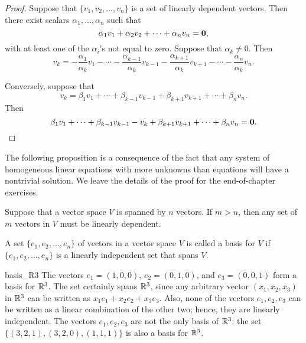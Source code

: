 \begin{proof}
Suppose that $\{ v_1, v_2, \dots, v_n \}$ is a set of linearly dependent
vectors.  Then there exist scalars $\alpha_1, \ldots, \alpha_n$
such that
\[
\alpha_1 v_1 + \alpha_2 v_2 + \cdots + \alpha_n v_n = {\bold 0 },
\]
with at least one of the $\alpha_i$'s not equal to zero.  Suppose that
$\alpha_k \neq 0$. Then 
\[
v_k = - \frac{\alpha_1}{\alpha_k} v_1 
- \cdots 
- \frac{\alpha_{k-1}}{\alpha_k}	v_{k-1}
- \frac{\alpha_{k+1}}{\alpha_k}	v_{k+1}
- \cdots 
- \frac{\alpha_n}{\alpha_k} v_n.
\]


Conversely, suppose that 
\[
v_k = \beta_1 v_1 
+ \cdots 
+ \beta_{k-1} v_{k-1}
+ \beta_{k+1} v_{k+1}
+ \cdots 
+ \beta_n v_n.
\]
Then
\[
\beta_1 v_1 
+ \cdots 
+ \beta_{k-1} v_{k-1}
- v_k
+ \beta_{k+1} v_{k+1}
+ \cdots 
+ \beta_n v_n = {\bold 0}.
\]
\end{proof}

\medskip


The following proposition is a consequence of the fact that any system
of homogeneous linear equations with more unknowns than equations will
have a nontrivial solution.  We leave the details of the proof for the
end-of-chapter exercises. 
 

\begin{proposition}
Suppose that a vector space $V$ is spanned by $n$ vectors. If $m > n$,
then any set of $m$ vectors in $V$ must be linearly dependent. 
\end{proposition}
 
  
A set $\{ e_1, e_2, \ldots, e_n \}$ of vectors in a vector space $V$
is called a {\bfi basis\/} for $V$ if $\{
e_1, e_2, \ldots, e_n \}$ is a linearly independent set that spans
$V$.

 
 
\begin{example}{basis_R3}
The vectors $e_1 = (1, 0, 0)$, $e_2 = (0, 1, 0)$, and $e_3 =(0, 0, 1)$
form a basis for ${\Bbb R}^3$.  The set certainly spans ${\Bbb R}^3$,
since any arbitrary vector $(x_1, x_2, x_3)$ in ${\Bbb R}^3$ can be
written as $x_1 e_1 + x_2 e_2 + x_3 e_3$. Also, none of the vectors
$e_1, e_2, e_3$ can be written as a linear combination of the other
two; hence, they are linearly independent.  The vectors $e_1, e_2,
e_3$ are not the only basis of ${\Bbb R}^3$:  the set $\{ (3, 2, 1),
(3, 2, 0), (1, 1, 1) \}$ is also a basis for ${\Bbb R}^3$. 
\end{example}

 
 
